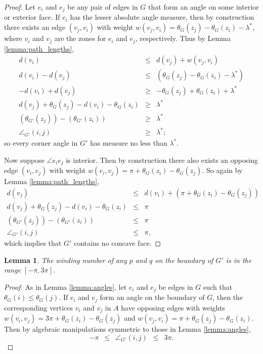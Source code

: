 \documentclass[11pt,letter]{article}
\newtheorem{lemma}[theorem]{Lemma}
\begin{document}
\begin{proof}
Let $e_i$ and $e_j$ be any pair of edges in $G$ that form an angle on some interior or exterior face.  If $e_i$ has the lesser absolute angle measure, then by construction there exists an edge $(v_j,v_i)$ with weight $w(v_j,v_i)=\theta_G(z_j)-\theta_G(z_i)-\lambda^*$, where $v_i$ and $v_j$ are the zones for $e_i$ and $e_j$, respectively.  Thus by Lemma \ref{lemma:path_lengths},
\begin{eqnarray*}
d(v_i) &\leq& d(v_j)+w(v_j,v_i) \\
d(v_i)-d(v_j) &\leq& (\theta_G(z_j)-\theta_G(z_i)-\lambda^*) \\
-d(v_i)+d(v_j) &\geq& -\theta_G(z_j)+\theta_G(z_i)+\lambda^* \\
d(v_j)+\theta_G(z_j)-d(v_i)-\theta_G(z_i) &\geq&\lambda^* \\
(\theta_{G'}(z_j))-(\theta_{G'}(z_i)) &\geq& \lambda^* \\
\angle_{G'}(i,j) &\geq& \lambda^* ;
\end{eqnarray*}
\noindent so every corner angle in $G'$ has measure no less than $\lambda^*$.

Now suppose $\angle e_i e_j$ is interior.  Then by construction there also exists an opposing edge $(v_i,v_j)$ with weight $w(v_i,v_j)=\pi+\theta_G(z_i)-\theta_G(z_j)$.  So again by Lemma \ref{lemma:path_lengths},
\begin{eqnarray*}
d(v_j) &\leq& d(v_i)+(\pi+\theta_G(z_i)-\theta_G(z_j)) \\
d(v_j)+\theta_G(z_j)-d(v_i)-\theta_G(z_i) &\leq& \pi \\
(\theta_{G'}(z_j))-(\theta_{G'}(z_i)) &\leq& \pi \\
\angle_{G'}(i,j) &\leq& \pi ,
\end{eqnarray*}
\noindent which implies that $G'$ contains no concave face.
\end{proof}

\begin{lemma}
\label{lemma:winding_numbers}
The winding number of any $p$ and $q$ on the boundary of $G'$ is in the range $[-\pi,3\pi]$.
\end{lemma}

\begin{proof}
As in Lemma \ref{lemma:angles}, let $e_i$ and $e_j$ be edges in $G$ such that $\theta_G(i) \leq \theta_G(j)$.  If $e_i$ and $e_j$ form an angle on the boundary of $G$, then the corresponding vertices $v_i$ and $v_j$ in $A$ have opposing edges with weights $w(v_i,v_j)= 3\pi + \theta_G(z_i) - \theta_G(z_j)$ and $w(v_j,v_i)=\pi+\theta_G(z_j)-\theta_G(z_i)$.  Then by algebraic manipulations symmetric to those in Lemma \ref{lemma:angles},
\[ -\pi \enspace \leq \enspace \angle_{G'}(i,j) \enspace \leq \enspace 3\pi . \]
\end{proof}
\end{document}
